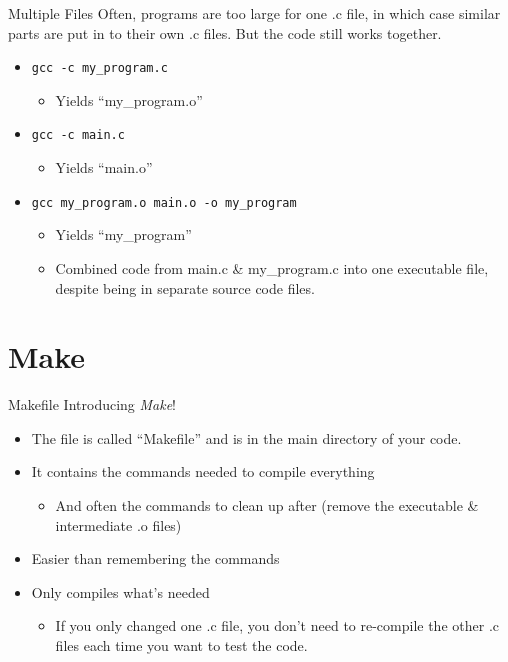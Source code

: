 \documentclass[graphics]{beamer}
\begin{document}
\begin{frame}{Multiple Files}
    Often, programs are too large for one .c file, in which case similar parts are put in to their own .c files. But the code still works together.
    \begin{itemize}
        \item \texttt{gcc -c my\_program.c}
        \begin{itemize}
            \item Yields ``my\_program.o''
        \end{itemize}
        \item \texttt{gcc -c main.c}
        \begin{itemize}
            \item Yields ``main.o''
        \end{itemize}
        \item \texttt{gcc my\_program.o main.o -o my\_program}
        \begin{itemize}
            \item Yields ``my\_program''
            \item Combined code from main.c \& my\_program.c into one executable file, despite being in separate source code files.
        \end{itemize}
    \end{itemize}
\end{frame}

\section*{Make}
\begin{frame}{Makefile}
    Introducing \textit{Make}!
    \begin{itemize}
        \item The file is called ``Makefile'' and is in the main directory of your code.
        \item It contains the commands needed to compile everything
        \begin{itemize}
            \item And often the commands to clean up after (remove the executable \& intermediate .o files)
        \end{itemize}
        \item Easier than remembering the commands
        \item Only compiles what's needed
        \begin{itemize}
            \item If you only changed one .c file, you don't need to re-compile the other .c files each time you want to test the code.
        \end{itemize}
    \end{itemize}
\end{frame}
\end{document}
